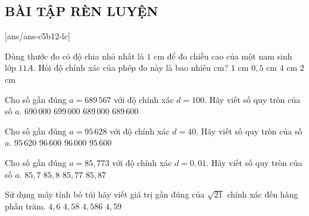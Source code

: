 \subsection{BÀI TẬP RÈN LUYỆN}
 
\setcounter{ex}{0}
[ans/ans-c5b12-lc]
\begin{ex}%
	Dùng thước đo có độ chia nhỏ nhất là $1$ cm để đo chiều cao của một nam sinh lớp $11A$. Hỏi độ chính xác của phép đo này là bao nhiêu cm?
	\choice
	{$1$ cm}
	{\True $0{,}5$ cm}
	{$4$ cm}
	{$2$ cm}
\end{ex}
\begin{ex}%
	Cho số gần đúng $a=689\,567$ với độ chính xác $d=100$. Hãy viết số quy tròn của số $a$.
	\choice
	{\True $690\,000$}
	{$699\,000$}
	{$689\,000$}
	{$689\,600$}
\end{ex}
\begin{ex}%
	Cho số gần đúng $a=95\,628$ với độ chính xác $d=40$. Hãy viết số quy tròn của số $a$.
	\choice
	{$95\,620$}
	{$96\,600$}
	{$96\,000$}
	{\True $95\,600$}
\end{ex}
\begin{ex}%
	Cho số gần đúng $a=85{,}773$ với độ chính xác $d=0{,}01$. Hãy viết số quy tròn của số $a$.
	\choice
	{$85{,}7$}
	{\True $85{,}8$}
	{$85{,}77$}
	{$85{,}87$}
\end{ex}
\begin{ex}%
	Sử dụng máy tính bỏ túi hãy viết giá trị gần đúng của $\sqrt{21}$ chính xác đến hàng phần trăm.
	\choice
	{$4{,}6$}
	{\True $4{,}58$}
	{$4{,}586$}
	{$4{,}59$}
\end{ex}
